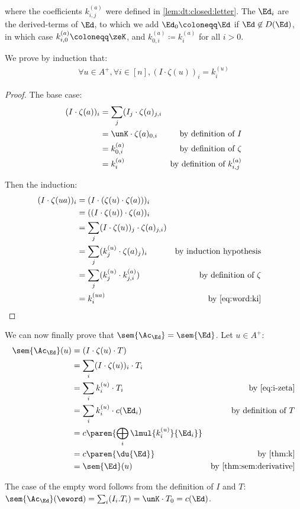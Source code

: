 \documentclass[a4paper,USenglish]{lipics}
\begin{document}
\noindent
where the coefficients $k_{i, j}^{(a)}$ were defined in
\cref{lem:dt:closed:letter}.  The $\Ed_i$ are the derived-terms of $\Ed$, to
which we add $\Ed_0 \coloneqq \Ed$ if $\Ed \not\in D(\Ed)$, in which case
$k_{i,0}^{(a)} \coloneqq \zeK$, and $k_{0,i}^{(a)} \coloneqq k_i^{(a)}$ for
all $i > 0$.

We prove by induction that:
\begin{gather}
  \label{eq:i-zeta}
  \forall u \in A^+, \forall i \in [n],  (I\cdot \zeta(u))_i = k_i^{(u)}
\end{gather}

\begin{proof}
  The base case:
  \begin{align*}
    (I \cdot \zeta(a))_i
    &= \sum_j (I_j \cdot \zeta(a)_{j,i} \\
    &= \unK \cdot \zeta(a)_{0,i} & \text{by definition of $I$} \\
    &= k_{0,i}^{(a)} & \text{by definition of $\zeta$} \\
    &= k_i^{(a)} & \text{by definition of $k_{i,j}^{(a)}$}
  \end{align*}

  Then the induction:
  \begin{align*}
    (I\cdot \zeta(ua))_i
    &= (I\cdot (\zeta(u)\cdot\zeta(a)))_i \\
    &= ((I\cdot \zeta(u))\cdot\zeta(a))_i \\
    &= \sum_{j}(I\cdot \zeta(u))_j \cdot \zeta(a)_{j,i}) \\
    &= \sum_{j}(k_j^{(u)} \cdot \zeta(a)_j)_i & \text{by induction hypothesis}\\
    &= \sum_{j}(k_j^{(u)} \cdot k^{(a)}_{j,i}) & \text{by definition of $\zeta$}\\
    &= k_i^{(ua)} & \text{by \cref{eq:word:ki}}
    & \hfill\qedhere
  \end{align*}
\end{proof}

We can now finally prove that $\sem{\Ac_\Ed} = \sem{\Ed}$.  Let $u \in A^+$:
\begin{align*}
  \sem{\Ac_\Ed}(u)
  &= (I \cdot \zeta(u) \cdot T) \\
  &= \sum_i (I \cdot \zeta(u))_i \cdot T_i \\
  &= \sum_i k_i^{(u)} \cdot T_i & \text{by \cref{eq:i-zeta}} \\
  &= \sum_i k_i^{(u)} \cdot c(\Ed_i) & \text{by definition of $T$} \\
  &= c\paren{\bigoplus_i \lmul{k_i^{(u)}}{\Ed_i}}\\
  &= c\paren{\du{\Ed}} & \text{by \cref{thm:k}}\\
  &= \sem{\Ed}(u) & \text{by \cref{thm:sem:derivative}} \\
\end{align*}

The case of the empty word follows from the definition of $I$ and $T$:
$\sem{\Ac_\Ed}(\eword) = \sum_i (I_i . T_i) = \unK \cdot T_0 = c(\Ed)$.
\end{document}

